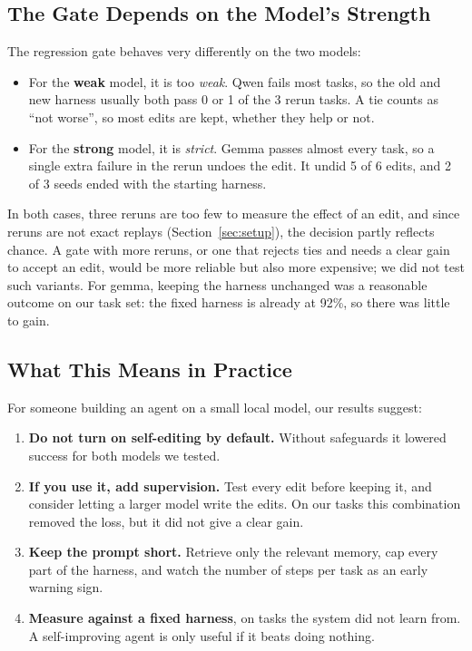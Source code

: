 \subsection{The Gate Depends on the Model's Strength}

The regression gate behaves very differently on the two models:
\begin{itemize}
  \item For the \textbf{weak} model, it is too \emph{weak}. Qwen fails most tasks, so the old and new
        harness usually both pass 0 or 1 of the 3 rerun tasks. A tie counts as ``not worse'', so most
        edits are kept, whether they help or not.
  \item For the \textbf{strong} model, it is \emph{strict}. Gemma passes almost every task, so a
        single extra failure in the rerun undoes the edit. It undid 5 of 6 edits, and 2 of 3 seeds
        ended with the starting harness.
\end{itemize}
In both cases, three reruns are too few to measure the effect of an edit, and since reruns are not
exact replays (Section~\ref{sec:setup}), the decision partly reflects chance. A gate with more
reruns, or one that rejects ties and needs a clear gain to accept an edit, would be more reliable
but also more expensive; we did not test such variants. For gemma, keeping the harness unchanged was
a reasonable outcome on our task set: the fixed harness is already at 92\%, so there was little to
gain.

\subsection{What This Means in Practice}

For someone building an agent on a small local model, our results suggest:
\begin{enumerate}
  \item \textbf{Do not turn on self-editing by default.} Without safeguards it lowered success for
        both models we tested.
  \item \textbf{If you use it, add supervision.} Test every edit before keeping it, and consider
        letting a larger model write the edits. On our tasks this combination removed the loss, but
        it did not give a clear gain.
  \item \textbf{Keep the prompt short.} Retrieve only the relevant memory, cap every part of the
        harness, and watch the number of steps per task as an early warning sign.
  \item \textbf{Measure against a fixed harness}, on tasks the system did not learn from. A
        self-improving agent is only useful if it beats doing nothing.
\end{enumerate}


